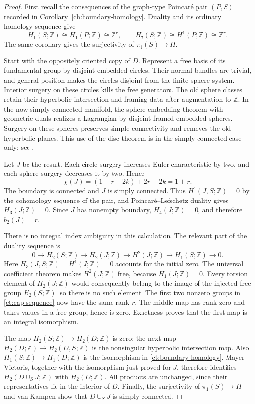 \documentclass[11pt]{article}
\theoremstyle{definition}
\theoremstyle{remark}
\newcommand{\Z}{\mathbb Z}
\begin{document}
\begin{proof}
First recall the consequences of the graph-type Poincar\'e pair $(P,S)$
recorded in Corollary~\ref{ch:boundary-homology}.  Duality and its
ordinary homology sequence give
\begin{equation}\label{ct:boundary-homology}
 H_1(S;\Z)\cong H_1(P;\Z)\cong\Z^r,
 \qquad H_2(S;\Z)\cong H^1(P;\Z)\cong\Z^r.
\end{equation}
The same corollary gives the surjectivity of $\pi_1(S)\to H$.

Start with the oppositely oriented copy of $D$.  Represent a free basis
of its fundamental group by disjoint embedded circles.  Their normal
bundles are trivial, and general position makes the circles disjoint
from the finite sphere system.  Interior surgery on these circles kills
the free generators.  The old sphere classes retain their hyperbolic
intersection and framing data after augmentation to $\Z$.  In the now
simply connected manifold, the sphere embedding theorem with geometric
duals realizes a Lagrangian by disjoint framed embedded spheres.  Surgery
on these spheres preserves simple connectivity and removes the old
hyperbolic planes.  This use of the disc theorem is in the simply
connected case only; see \cite[Theorem~B]{PRT}.

Let $J$ be the result.  Each circle surgery increases Euler characteristic
by two, and each sphere surgery decreases it by two.  Hence
\[
 \chi(J)=(1-r+2k)+2r-2k=1+r.
\]
The boundary is connected and $J$ is simply connected.  Thus
$H^1(J,S;\Z)=0$ by the cohomology sequence of the pair, and
Poincar\'e--Lefschetz duality gives $H_3(J;\Z)=0$.  Since $J$ has nonempty
boundary, $H_4(J;\Z)=0$, and therefore $b_2(J)=r$.

There is no integral index ambiguity in this calculation.  The relevant
part of the duality sequence is
\begin{equation}\label{ct:cap-sequence}
 0\longrightarrow H_2(S;\Z)\longrightarrow H_2(J;\Z)
 \longrightarrow H^2(J;\Z)\longrightarrow H_1(S;\Z)
 \longrightarrow0.
\end{equation}
Here $H_3(J,S;\Z)=H^1(J;\Z)=0$ accounts for the initial zero.
The universal coefficient theorem makes $H^2(J;\Z)$ free, because
$H_1(J;\Z)=0$.  Every torsion element of $H_2(J;\Z)$ would consequently
belong to the image of the injected free group $H_2(S;\Z)$, so there is
no such element.  The first two nonzero groups in
\eqref{ct:cap-sequence} now have the same rank $r$.  The middle map has
rank zero and takes values in a free group, hence is zero.  Exactness
proves that the first map is an integral isomorphism.

The map $H_2(S;\Z)\to H_2(D;\Z)$ is zero: the next map
$H_2(D;\Z)\to H_2(D,S;\Z)$ is the nonsingular hyperbolic intersection
map.  Also $H_1(S;\Z)\to H_1(D;\Z)$ is the isomorphism in
\eqref{ct:boundary-homology}.  Mayer--Vietoris, together with the
isomorphism just proved for $J$, therefore identifies
$H_2(D\cup_S J;\Z)$ with $H_2(D;\Z)$.  All products are unchanged,
since their representatives lie in the interior of $D$.
Finally, the surjectivity of $\pi_1(S)\to H$ and van Kampen show that
$D\cup_S J$ is simply connected.
\end{proof}
\end{document}
